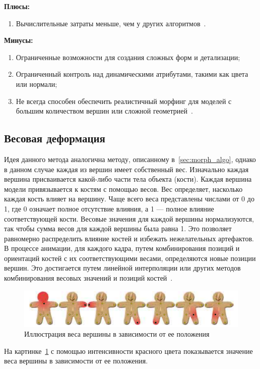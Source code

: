 \newpage

\textbf{Плюсы:}
\begin{enumerate}
	\item Вычислительные затраты меньше, чем у других алгоритмов~\cite{morphing_methods}.
\end{enumerate}

\textbf{Минусы:}
\begin{enumerate}
	\item Ограниченные возможности для создания сложных форм и детализации;
	\item Ограниченный контроль над динамическими атрибутами, такими как цвета или нормали;
	\item Не всегда способен обеспечить реалистичный морфинг для моделей с большим количеством вершин или сложной геометрией~\cite{morphing_methods}.
\end{enumerate}


\subsection{Весовая деформация}
Идея данного метода аналогична методу, описанному в~\ref{sec:morph_algo}, однако в данном случае каждая из вершин имеет собственный вес.
Изначально каждая вершина присваивается какой-либо части тела объекта (кости). 
Каждая вершина модели привязывается к костям с помощью весов. 
Вес определяет, насколько каждая кость влияет на вершину. 
Чаще всего веса представлены числами от 0 до 1, где 0 означает полное отсутствие влияния, а 1 --- полное влияние соответствующей кости. 
Весовые значения для каждой вершины нормализуются, так чтобы сумма весов для каждой вершины была равна 1. 
Это позволяет равномерно распределить влияние костей и избежать нежелательных артефактов. 
В процессе анимации, для каждого кадра, путем комбинирования позиций и ориентаций костей с их соответствующими весами, определяются новые позиции вершин.
Это достигается путем линейной интерполяции или других методов комбинирования весовых значений и позиций костей~\cite{weight_morphing}.

\begin{figure}[h]
	\centering
	\includegraphics[scale=0.8]{images/stickman_weights.png}
	\caption{Иллюстрация веса вершины в зависимости от ее положения}
	\label{fig:stickman_weights}
\end{figure}
На картинке~\ref{fig:stickman_weights} с помощью интенсивности красного цвета показывается значение веса вершины в зависимости от ее положения.

